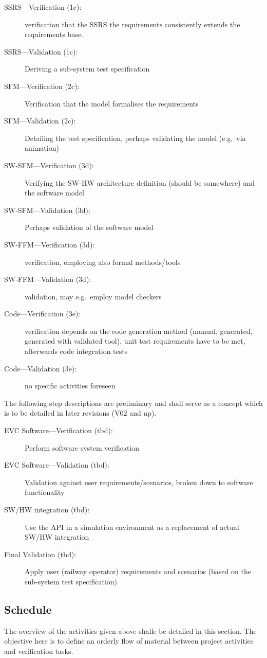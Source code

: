 \documentclass{template/openetcs_report}
\begin{document}
\begin{description}
\item[SSRS---Verification (1c):] verification that the SSRS the requirements
  consistently extends the requirements base. 
\item[SSRS---Validation (1c):] Deriving a sub-system test specification
\item[SFM---Verification (2c):] Verification that the model formalises
  the requirements
\item[SFM---Validation (2c):] Detailing the test specification,
  perhaps validating the model (e.g.\ via animation)
\item[SW-SFM---Verification (3d):] Verifying the SW-HW architecture
  definition (should be somewhere) and the software model
\item[SW-SFM---Validation (3d):]Perhaps validation of the software model
\item[SW-FFM---Verification (3d):]  verification, employing also
  formal methods/tools 
\item[SW-FFM---Validation (3d):] validation, may e.g.\ employ model checkers
\item[Code---Verification (3e):] verification depends on the code
  generation method (manual, generated, generated with validated
  tool), unit test requirements have to be met, afterwards code
  integration tests
\item[Code---Validation (3e):] no specific activities foreseen
\end{description}

The following step descriptions are preliminary and shall serve as a
concept which is to be detailed in later revisions (V02 and up).
%
\begin{description}
\item[EVC Software---Verification (tbd):] Perform software system verification
\item[EVC Software---Validation (tbd):] Validation against user
  requirements/scenarios, broken down to software functionality
\item[SW/HW integration (tbd):] Use the API in a simulation
  environment as a replacement of actual SW/HW integration
\item[Final Validation (tbd):] Apply user (railway operator) requirements and scenarios (based
  on the sub-system test specification)
\end{description}

\subsection{Schedule}
The overview of the activities given above shalle be detailed in this
section. The objective here is to define an orderly flow of
material between project activities and verification tasks. 
\end{document}
